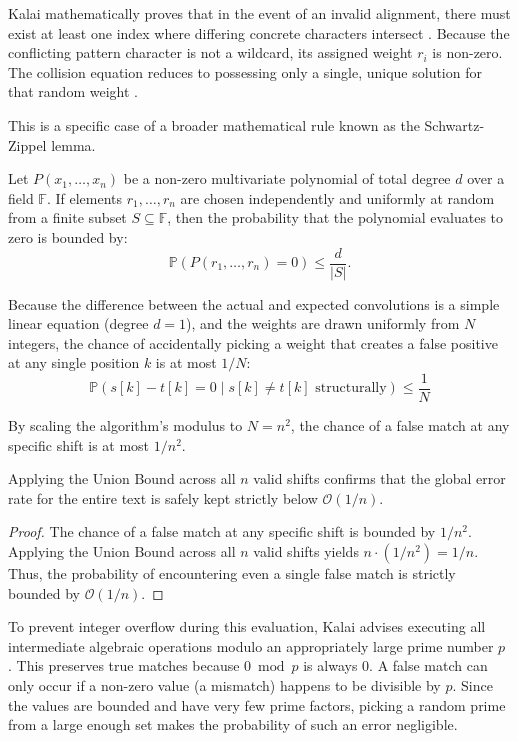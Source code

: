 Kalai mathematically proves that in the event of an invalid alignment, there must exist at least one index where differing concrete characters intersect \cite{kalai2002}. Because the conflicting pattern character is not a wildcard, its assigned weight $r_i$ is non-zero. The collision equation reduces to possessing only a single, unique solution for that random weight \cite{kalai2002}. 

This is a specific case of a broader mathematical rule known as the Schwartz-Zippel lemma.
\begin{lemma}
Let $P(x_1, \dots, x_n)$ be a non-zero multivariate polynomial of total degree $d$ over a field $\mathbb{F}$. If elements $r_1, \dots, r_n$ are chosen independently and uniformly at random from a finite subset $S \subseteq \mathbb{F}$, then the probability that the polynomial evaluates to zero is bounded by:
\begin{equation}
    \mathbb{P}(P(r_1, \dots, r_n) = 0) \le \frac{d}{|S|}.
\end{equation}
\end{lemma}

Because the difference between the actual and expected convolutions is a simple linear equation (degree $d=1$), and the weights are drawn uniformly from $N$ integers, the chance of accidentally picking a weight that creates a false positive at any single position $k$ is at most $1/N$:
\begin{equation}
    \mathbb{P}(s[k] - t[k] = 0 \mid s[k] \neq t[k] \text{ structurally}) \le \frac{1}{N}
\end{equation}

By scaling the algorithm's modulus to $N = n^2$, the chance of a false match at any specific shift is at most $1/n^2$. 

\begin{theorem}
Applying the Union Bound across all $n$ valid shifts confirms that the global error rate for the entire text is safely kept strictly below $\mathcal{O}(1/n)$.
\end{theorem}
\begin{proof}
The chance of a false match at any specific shift is bounded by $1/n^2$. Applying the Union Bound across all $n$ valid shifts yields $n \cdot (1/n^2) = 1/n$. Thus, the probability of encountering even a single false match is strictly bounded by $\mathcal{O}(1/n)$.
\end{proof}

To prevent integer overflow during this evaluation, Kalai advises executing all intermediate algebraic operations modulo an appropriately large prime number $p$ \cite{kalai2002}. This preserves true matches because $0 \bmod p$ is always $0$. A false match can only occur if a non-zero value (a mismatch) happens to be divisible by $p$. Since the values are bounded and have very few prime factors, picking a random prime from a large enough set makes the probability of such an error negligible.

